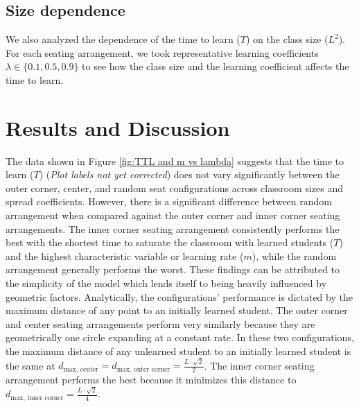 \documentclass[10pt,a4paper,twoside]{article}
\begin{document}
\subsection{Size dependence}
We also analyzed the dependence of the time to learn ($T$) on the class size ($L^2$). For each seating arrangement, we took representative learning coefficients $\lambda \in \lbrace 0.1, 0.5, 0.9 \rbrace$ to see how the class size and the learning coefficient affects the time to learn.

\section{Results and Discussion}
The data shown in Figure \ref{fig:TTL and m vs lambda} suggests that the time to learn ($T$) (\textit{Plot labels not yet corrected}) does not vary significantly between the outer corner, center, and random seat configurations across classroom sizes and spread coefficients. However, there is a significant difference between random arrangement when compared against the outer corner and inner corner seating arrangements. The inner corner seating arrangement consistently performs the best with the shortest time to saturate the classroom with learned students ($T$) and the highest characteristic variable or learning rate ($m$), while the random arrangement generally performs the worst. These findings can be attributed to the simplicity of the model which lends itself to being heavily influenced by geometric factors. Analytically, the configurations’ performance is dictated by the maximum distance of any point to an initially learned student. The outer corner and center seating arrangements perform very similarly because they are geometrically one circle expanding at a constant rate. In these two configurations, the maximum distance of any unlearned student to an initially learned student is the same at $d_{\text{max, center}} = d_{\text{max, outer corner}}=\frac{L\cdot\sqrt{2}}{2}$. The inner corner seating arrangement performs the best because it minimizes this distance to $d_{\text{max, inner corner}}=\frac{L\cdot\sqrt{2}}{4}$.
\end{document}
